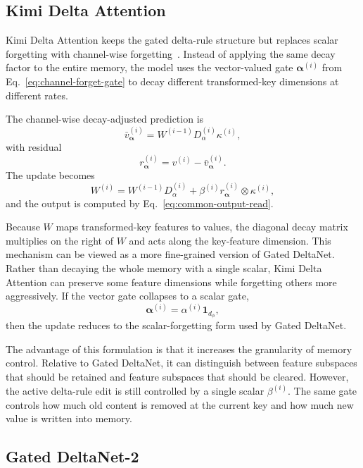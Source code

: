 \documentclass{article}
\begin{document}
\subsection{Kimi Delta Attention}

Kimi Delta Attention keeps the gated delta-rule structure but replaces scalar forgetting with channel-wise forgetting~\cite{kimi2025linear}. Instead of applying the same decay factor to the entire memory, the model uses the vector-valued gate $\bm{\alpha}^{(i)}$ from Eq.~\eqref{eq:channel-forget-gate} to decay different transformed-key dimensions at different rates.

The channel-wise decay-adjusted prediction is
\begin{equation}
\bar v_{\bm{\alpha}}^{(i)}
=
W^{(i-1)}
D_{\alpha}^{(i)}
\kappa^{(i)},
\end{equation}
with residual
\begin{equation}
r_{\bm{\alpha}}^{(i)}
=
v^{(i)}
-
\bar v_{\bm{\alpha}}^{(i)}.
\end{equation}
The update becomes
\begin{equation}
W^{(i)}
=
W^{(i-1)}
D_{\alpha}^{(i)}
+
\beta^{(i)}
r_{\bm{\alpha}}^{(i)}
\otimes
\kappa^{(i)},
\end{equation}
and the output is computed by Eq.~\eqref{eq:common-output-read}.

Because $W$ maps transformed-key features to values, the diagonal decay matrix multiplies on the right of $W$ and acts along the key-feature dimension. This mechanism can be viewed as a more fine-grained version of Gated DeltaNet. Rather than decaying the whole memory with a single scalar, Kimi Delta Attention can preserve some feature dimensions while forgetting others more aggressively. If the vector gate collapses to a scalar gate,
\[
\bm{\alpha}^{(i)}
=
\alpha^{(i)} \mathbf{1}_{d_\phi},
\]
then the update reduces to the scalar-forgetting form used by Gated DeltaNet.

The advantage of this formulation is that it increases the granularity of memory control. Relative to Gated DeltaNet, it can distinguish between feature subspaces that should be retained and feature subspaces that should be cleared. However, the active delta-rule edit is still controlled by a single scalar $\beta^{(i)}$. The same gate controls how much old content is removed at the current key and how much new value is written into memory.

\subsection{Gated DeltaNet-2}
\end{document}
